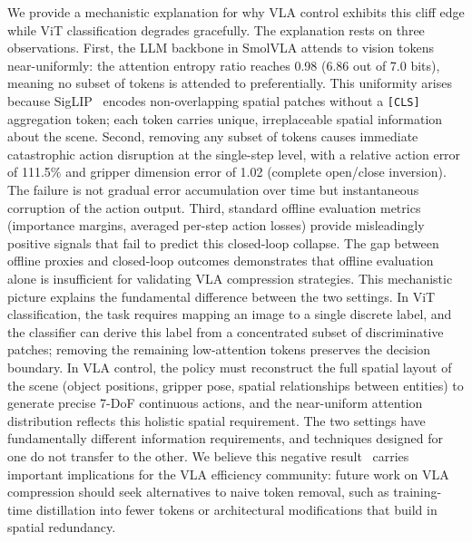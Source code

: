 We provide a mechanistic explanation for why VLA control exhibits this cliff edge while ViT classification degrades gracefully.
The explanation rests on three observations.
First, the LLM backbone in SmolVLA attends to vision tokens near-uniformly: the attention entropy ratio reaches 0.98 (6.86 out of 7.0 bits), meaning no subset of tokens is attended to preferentially.
This uniformity arises because SigLIP~\cite{zhai2023siglip} encodes non-overlapping spatial patches without a \texttt{[CLS]} aggregation token; each token carries unique, irreplaceable spatial information about the scene.
Second, removing any subset of tokens causes immediate catastrophic action disruption at the single-step level, with a relative action error of 111.5\% and gripper dimension error of 1.02 (complete open/close inversion).
The failure is not gradual error accumulation over time but instantaneous corruption of the action output.
Third, standard offline evaluation metrics (importance margins, averaged per-step action losses) provide misleadingly positive signals that fail to predict this closed-loop collapse.
The gap between offline proxies and closed-loop outcomes demonstrates that offline evaluation alone is insufficient for validating VLA compression strategies.
This mechanistic picture explains the fundamental difference between the two settings.
In ViT classification, the task requires mapping an image to a single discrete label, and the classifier can derive this label from a concentrated subset of discriminative patches; removing the remaining low-attention tokens preserves the decision boundary.
In VLA control, the policy must reconstruct the full spatial layout of the scene (object positions, gripper pose, spatial relationships between entities) to generate precise 7-DoF continuous actions, and the near-uniform attention distribution reflects this holistic spatial requirement.
The two settings have fundamentally different information requirements, and techniques designed for one do not transfer to the other.
We believe this negative result~\cite{karl2024negative,zeng2023transformers_tsf} carries important implications for the VLA efficiency community: future work on VLA compression should seek alternatives to naive token removal, such as training-time distillation into fewer tokens or architectural modifications that build in spatial redundancy.

